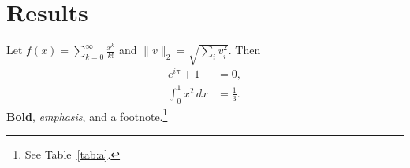 \documentclass[11pt]{article}
\begin{document}
\section{Results}
Let $f(x) = \sum_{k=0}^{\infty} \frac{x^k}{k!}$ and $\|v\|_2 = \sqrt{\sum_i v_i^2}$. Then
\begin{align}
  e^{i\pi} + 1 &= 0, \\
  \int_0^1 x^2\,dx &= \tfrac{1}{3}.
\end{align}
\textbf{Bold}, \emph{emphasis}, and a footnote.\footnote{See Table~\ref{tab:a}.}
\end{document}
